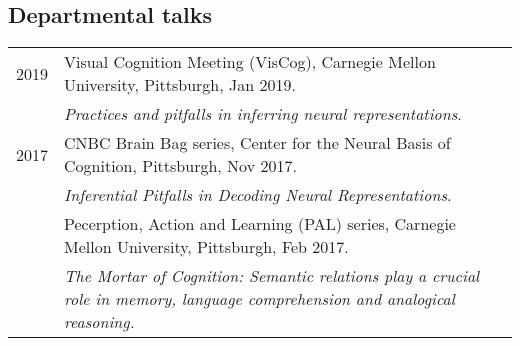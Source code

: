 \documentclass[letterpaper]{article}
\begin{document}
\subsection*{Departmental talks}
\begin{longtable}{p{0.7cm}p{15cm}}
2019 & Visual Cognition Meeting (VisCog), Carnegie Mellon University, Pittsburgh, Jan 2019.\\ & {\it Practices and pitfalls in inferring neural representations}.\\[6pt]
2017 & CNBC Brain Bag series, Center for the Neural Basis of Cognition, Pittsburgh, Nov 2017.\\ & {\it Inferential Pitfalls in Decoding Neural Representations}.\\[6pt]
& Pecerption, Action and Learning (PAL) series, Carnegie Mellon University, Pittsburgh, Feb 2017.\\ & {\it The Mortar of Cognition: Semantic relations play a crucial role in memory, language comprehension and analogical reasoning.}\\[6pt]
\end{longtable}
\end{document}
